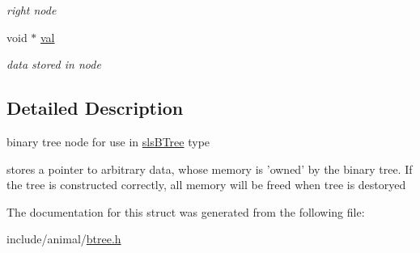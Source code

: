 \begin{DoxyCompactItemize}
\begin{DoxyCompactList}\small\item\em right node \end{DoxyCompactList}\item 
\hypertarget{structsls_b_node_aa6844e99529c2563d7deceab8c9e0a97}{void $\ast$ \hyperlink{structsls_b_node_aa6844e99529c2563d7deceab8c9e0a97}{val}}\label{structsls_b_node_aa6844e99529c2563d7deceab8c9e0a97}

\begin{DoxyCompactList}\small\item\em data stored in node \end{DoxyCompactList}\end{DoxyCompactItemize}


\subsection{Detailed Description}
binary tree node for use in \hyperlink{structsls_b_tree}{sls\+B\+Tree} type 

stores a pointer to arbitrary data, whose memory is 'owned' by the binary tree. If the tree is constructed correctly, all memory will be freed when tree is destoryed 

The documentation for this struct was generated from the following file\+:\begin{DoxyCompactItemize}
\item 
include/animal/\hyperlink{btree_8h}{btree.\+h}\end{DoxyCompactItemize}
